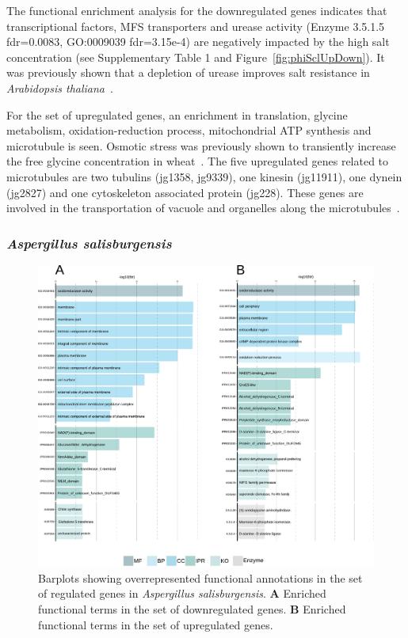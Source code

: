 \documentclass[jof,article,submit,moreauthors,pdftex,10pt,a4paper]{Definitions/mdpi}
\newcommand{\phiSp}{\textit{Aspergillus salisburgensis}}
\begin{document}
The functional enrichment analysis for the downregulated genes indicates that transcriptional factors,  MFS transporters and urease activity (Enzyme 3.5.1.5 fdr=0.0083, GO:0009039 fdr=3.15e-4) are negatively impacted by the high salt concentration (see Supplementary Table 1 and Figure~\ref{fig:phiSclUpDown}). It was previously shown that a depletion of urease improves salt resistance in \textit{Arabidopsis thaliana}~\cite{Bu2015}.

For the set of upregulated genes, an enrichment in translation, glycine metabolism, oxidation-reduction process, mitochondrial ATP synthesis and microtubule is seen. Osmotic stress was previously shown to transiently increase the free glycine concentration in wheat~\cite{Kovacs2012}. The five upregulated genes related to microtubules are two tubulins (jg1358, jg9339), one kinesin (jg11911), one dynein (jg2827) and one cytoskeleton associated protein (jg228). These genes are involved in the transportation of vacuole and organelles along the microtubules~\cite{Vale2003}.
\subsubsection{\phiSp{}}
\begin{figure}[htpb]
    \centering
    \includegraphics[width=\linewidth]{phiSp_SALT_summary.pdf}
    \caption{\label{fig:phiSpUpDown} Barplots showing overrepresented functional annotations in the set of regulated genes in {\phiSp}. \textbf{A} Enriched functional terms in the set of downregulated genes. \textbf{B} Enriched functional terms in the set of upregulated genes.}
\end{figure}
\end{document}
